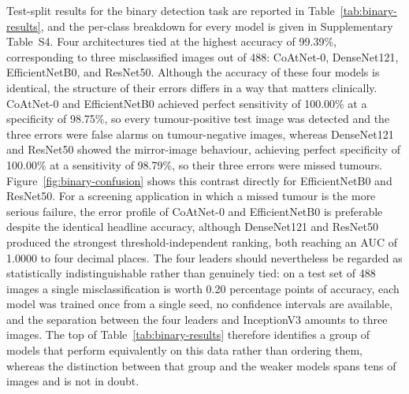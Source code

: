 \documentclass[final,3p,times,number]{elsarticle}
\begin{document}
Test-split results for the binary detection task are reported in Table~\ref{tab:binary-results}, and the per-class breakdown for every model is given in Supplementary Table~S4. Four architectures tied at the highest accuracy of 99.39\%, corresponding to three misclassified images out of 488: CoAtNet-0, DenseNet121, EfficientNetB0, and ResNet50. Although the accuracy of these four models is identical, the structure of their errors differs in a way that matters clinically. CoAtNet-0 and EfficientNetB0 achieved perfect sensitivity of 100.00\% at a specificity of 98.75\%, so every tumour-positive test image was detected and the three errors were false alarms on tumour-negative images, whereas DenseNet121 and ResNet50 showed the mirror-image behaviour, achieving perfect specificity of 100.00\% at a sensitivity of 98.79\%, so their three errors were missed tumours. Figure~\ref{fig:binary-confusion} shows this contrast directly for EfficientNetB0 and ResNet50. For a screening application in which a missed tumour is the more serious failure, the error profile of CoAtNet-0 and EfficientNetB0 is preferable despite the identical headline accuracy, although DenseNet121 and ResNet50 produced the strongest threshold-independent ranking, both reaching an AUC of 1.0000 to four decimal places. The four leaders should nevertheless be regarded as statistically indistinguishable rather than genuinely tied: on a test set of 488 images a single misclassification is worth 0.20 percentage points of accuracy, each model was trained once from a single seed, no confidence intervals are available, and the separation between the four leaders and InceptionV3 amounts to three images. The top of Table~\ref{tab:binary-results} therefore identifies a group of models that perform equivalently on this data rather than ordering them, whereas the distinction between that group and the weaker models spans tens of images and is not in doubt.
\end{document}
